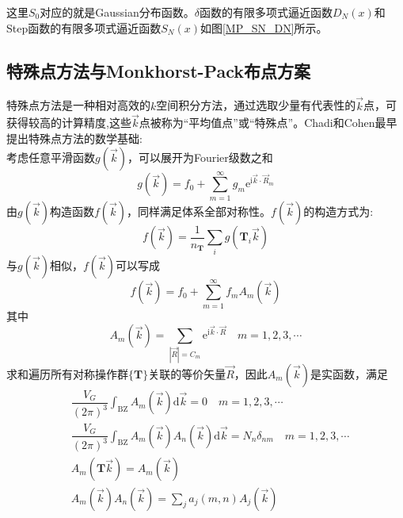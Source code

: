 这里$S_0$对应的就是\textrm{Gaussian}分布函数。$\delta$函数的有限多项式逼近函数$D_N(x)$和\textrm{Step}函数的有限多项式逼近函数$S_N(x)$如图\ref{MP_SN_DN}所示。
%

\subsection{特殊点方法与{\rm{Monkhorst-Pack}}布点方案}
特殊点方法是一种相对高效的$k$空间积分方法，通过选取少量有代表性的$\vec k$点，可获得较高的计算精度,这些$\vec k$点被称为“平均值点”\cite{PRB7-5212_1973}或“特殊点”\cite{PRB8-5747_1973}。\textrm{Chadi}和\textrm{Cohen}最早提出特殊点方法的数学基础:\\
考虑任意平滑函数$g(\vec k)$，可以展开为\textrm{Fourier}级数之和
\begin{equation}
	g(\vec k)=f_0+\sum_{m=1}^{\infty}g_m\mathrm{e}^{\mathrm{i}\vec k\cdot\vec R_m}
	\label{eq:solid_kpoint_Fourier}
\end{equation}
由$g(\vec k)$构造函数$f(\vec k)$，同样满足体系全部对称性。$f(\vec k)$的构造方式为:~
	$$f(\vec k)=\dfrac1{n_{\mathbf{T}}}\sum\limits_ig(\mathbf{T}_i\vec k)$$
与$g(\vec k)$相似，$f(\vec k)$可以写成
\begin{equation}
	f(\vec k)=f_0+\sum_{m=1}^{\infty}f_mA_m(\vec k)
	\label{eq:kpoint_Fourier_f}
\end{equation}
其中
	$$A_m(\vec k)=\sum_{|\vec R|=C_m}\mathrm{e}^{\mathrm{i}\vec k\cdot\vec R}\quad m=1,2,3,\cdots$$
求和遍历所有对称操作群$\{\mathbf{T}\}$关联的等价矢量$\vec R$，因此$A_m(\vec k)$是实函数，满足
	\begin{equation}
		\begin{aligned}
			&\dfrac{V_G}{(2\pi)^3}\int_{\mathrm{BZ}}A_m(\vec k)\mathrm{d}\vec k=0\quad m=1,2,3,\cdots\\
			&\dfrac{V_G}{(2\pi)^3}\int_{\mathrm{BZ}}A_m(\vec k)A_n(\vec k)\mathrm{d}\vec k=N_n\delta_{nm}\quad m=1,2,3,\cdots\\
			&A_m(\mathbf{T}\vec k)=A_m(\vec k)\\
			&A_m(\vec k)A_n(\vec k)=\sum_ja_j(m,n)A_j(\vec k)
		\end{aligned}
		\label{eq:kpoin_coeff_A}
	\end{equation}
